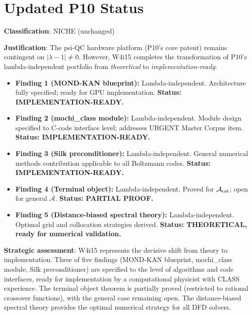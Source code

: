 \documentclass[11pt]{article}
\theoremstyle{definition}
\theoremstyle{remark}
\begin{document}
\section{Updated P10 Status}
\label{sec:p10-status}

\textbf{Classification}: NICHE (unchanged)

\textbf{Justification}: The psi-QC hardware platform (P10's core patent)
remains contingent on $|\lambda-1| \neq 0$. However, W4i15 completes
the transformation of P10's lambda-independent portfolio from
\emph{theoretical} to \emph{implementation-ready}:

\begin{itemize}[nosep]
\item \textbf{Finding 1 (MOND-KAN blueprint):} Lambda-independent.
  Architecture fully specified; ready for GPU implementation.
  \textbf{Status: IMPLEMENTATION-READY.}
\item \textbf{Finding 2 (mochi\_class module):} Lambda-independent.
  Module design specified to C-code interface level; addresses URGENT
  Master Corpus item. \textbf{Status: IMPLEMENTATION-READY.}
\item \textbf{Finding 3 (Silk preconditioner):} Lambda-independent.
  General numerical methods contribution applicable to all Boltzmann codes.
  \textbf{Status: IMPLEMENTATION-READY.}
\item \textbf{Finding 4 (Terminal object):} Lambda-independent.
  Proved for $\mathcal{A}_{\rm rat}$; open for general $\mathcal{A}$.
  \textbf{Status: PARTIAL PROOF.}
\item \textbf{Finding 5 (Distance-biased spectral theory):} Lambda-independent.
  Optimal grid and collocation strategies derived.
  \textbf{Status: THEORETICAL, ready for numerical validation.}
\end{itemize}

\textbf{Strategic assessment}: W4i15 represents the decisive shift from
theory to implementation. Three of five findings (MOND-KAN blueprint,
mochi\_class module, Silk preconditioner) are specified to the level of
algorithms and code interfaces, ready for implementation by a
computational physicist with CLASS experience. The terminal object
theorem is partially proved (restricted to rational crossover functions),
with the general case remaining open. The distance-biased spectral
theory provides the optimal numerical strategy for all DFD solvers.
\end{document}
